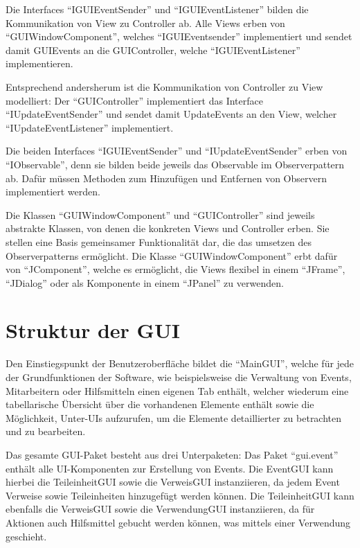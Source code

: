 Die Interfaces \enquote{IGUIEventSender} und \enquote{IGUIEventListener} bilden die Kommunikation von View zu Controller ab. Alle Views erben von \enquote{GUIWindowComponent}, welches \enquote{IGUIEventsender} implementiert und sendet damit GUIEvents an die GUIController, welche \enquote{IGUIEventListener} implementieren.

Entsprechend andersherum ist die Kommunikation von Controller zu View modelliert: Der \enquote{GUIController} implementiert das Interface \enquote{IUpdateEventSender} und sendet damit UpdateEvents an den View, welcher \enquote{IUpdateEventListener} implementiert.

Die beiden Interfaces \enquote{IGUIEventSender} und \enquote{IUpdateEventSender} erben von \enquote{IObservable}, denn sie bilden beide jeweils das Observable im Observerpattern ab. Dafür müssen Methoden zum Hinzufügen und Entfernen von Observern implementiert werden.

Die Klassen \enquote{GUIWindowComponent} und \enquote{GUIController} sind jeweils abstrakte Klassen, von denen die konkreten Views und Controller erben. Sie stellen eine Basis gemeinsamer Funktionalität dar, die das umsetzen des Observerpatterns ermöglicht. Die Klasse \enquote{GUIWindowComponent} erbt dafür von \enquote{JComponent}, welche es ermöglicht, die Views flexibel in einem \enquote{JFrame}, \enquote{JDialog} oder als Komponente in einem \enquote{JPanel} zu verwenden.

\section{Struktur der GUI}
Den Einstiegspunkt der Benutzeroberfläche bildet die \enquote{MainGUI}, welche für jede der Grundfunktionen der Software, wie beispielsweise die Verwaltung von Events, Mitarbeitern oder Hilfsmitteln einen eigenen Tab enthält, welcher wiederum eine tabellarische Übersicht über die vorhandenen Elemente enthält sowie die Möglichkeit, Unter-UIs aufzurufen, um die Elemente detaillierter zu betrachten und zu bearbeiten. 

Das gesamte GUI-Paket besteht aus drei Unterpaketen: Das Paket \enquote{gui.event} enthält alle UI-Komponenten zur Erstellung von Events. Die EventGUI kann hierbei die TeileinheitGUI sowie die VerweisGUI instanziieren, da jedem Event Verweise sowie Teileinheiten hinzugefügt werden können. Die TeileinheitGUI kann ebenfalls die VerweisGUI sowie die VerwendungGUI instanziieren, da für Aktionen auch Hilfsmittel gebucht werden können, was mittels einer Verwendung geschieht.

